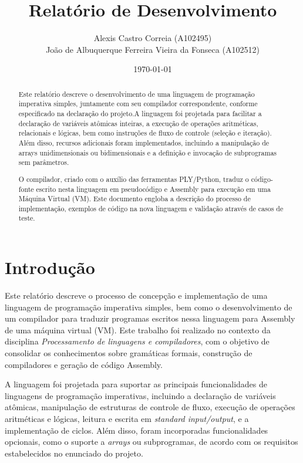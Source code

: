 \documentclass[12pt,a4paper]{report}
\title{Relatório de Desenvolvimento}
\author{Alexis Castro Correia (A102495) \\ João de Albuquerque Ferreira Vieira da Fonseca (A102512)}
\date{\today}
\begin{document}
\maketitle
\begin{abstract}

Este relatório descreve o desenvolvimento de uma linguagem de programação imperativa simples, juntamente com seu compilador correspondente, conforme especificado na declaração do projeto.A linguagem foi projetada para facilitar a declaração de variáveis atômicas inteiras, a execução de operações aritméticas, relacionais e lógicas, bem como instruções de fluxo de controle (seleção e iteração). Além disso, recursos adicionais foram implementados, incluindo a manipulação de arrays unidimensionais ou bidimensionais e a definição e invocação de subprogramas sem parâmetros.

O compilador, criado com o auxílio das ferramentas PLY/Python, traduz o código-fonte escrito nesta linguagem em pseudocódigo e Assembly para execução em uma Máquina Virtual (VM). Este documento engloba a descrição do processo de implementação, exemplos de código na nova linguagem e validação através de casos de teste.
\end{abstract}

\tableofcontents %
\chapter{Introdu\c{c}\~{a}o}

Este relatório descreve o processo de concepção e implementação de uma linguagem de programação imperativa simples, bem como o desenvolvimento de um compilador para traduzir programas escritos nessa linguagem para Assembly de uma máquina virtual (VM). Este trabalho foi realizado no contexto da disciplina \emph{Processamento de linguagens e compiladores}, com o objetivo de consolidar os conhecimentos sobre gramáticas formais, construção de compiladores e geração de código Assembly.

A linguagem foi projetada para suportar as principais funcionalidades de linguagens de programação imperativas, incluindo a declaração de variáveis atômicas, manipulação de estruturas de controle de fluxo, execução de operações aritméticas e lógicas, leitura e escrita em \emph{standard input/output}, e a implementação de ciclos. Além disso, foram incorporadas funcionalidades opcionais, como o suporte a \emph{arrays} ou subprogramas, de acordo com os requisitos estabelecidos no enunciado do projeto.
\end{document}
